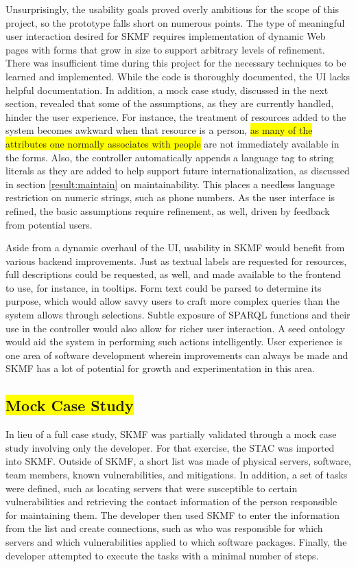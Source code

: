 Unsurprisingly, the usability goals proved overly ambitious for the scope of this project, so the prototype falls short on numerous points. The type of meaningful user interaction desired for SKMF requires implementation of dynamic Web pages with forms that grow in size to support arbitrary levels of refinement. There was insufficient time during this project for the necessary techniques to be learned and implemented. While the code is thoroughly documented, the UI lacks helpful documentation. In addition, a mock case study, discussed in the next section, revealed that some of the assumptions, as they are currently handled, hinder the user experience. For instance, the treatment of resources added to the system becomes awkward when that resource is a person,
\colorbox{yellow}{as many of the attributes one normally associates with people}
are not immediately available in the forms. Also, the controller automatically appends a language tag to string literals as they are added to help support future internationalization, as discussed in section
\ref{result:maintain}
on maintainability. This places a needless language restriction on numeric strings, such as phone numbers. As the user interface is refined, the basic assumptions require refinement, as well, driven by feedback from potential users.

Aside from a dynamic overhaul of the UI, usability in SKMF would benefit from various backend improvements. Just as textual labels are requested for resources, full descriptions could be requested, as well, and made available to the frontend to use, for instance, in tooltips. Form text could be parsed to determine its purpose, which would allow savvy users to craft more complex queries than the system allows through selections. Subtle exposure of SPARQL functions and their use in the controller would also allow for richer user interaction. A seed ontology would aid the system in performing such actions intelligently. User experience is one area of software development wherein improvements can always be made and SKMF has a lot of potential for growth and experimentation in this area.


\subsection{\colorbox{yellow}{Mock Case Study}}
\label{result:case-study}

In lieu of a full case study, SKMF was partially validated through a mock case study involving only the developer. For that exercise, the STAC
\cite{ontosec}
was imported into SKMF. Outside of SKMF, a short list was made of physical servers, software, team members, known vulnerabilities, and mitigations. In addition, a set of tasks were defined, such as locating servers that were susceptible to certain vulnerabilities and retrieving the contact information of the person responsible for maintaining them. The developer then used SKMF to enter the information from the list and create connections, such as who was responsible for which servers and which vulnerabilities applied to which software packages. Finally, the developer attempted to execute the tasks with a minimal number of steps.

